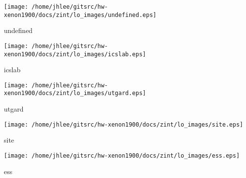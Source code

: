 \noindent
\vspace{1.4cm}
\begin{minipage}{.2\textwidth}
\begin{center}
\texttt{[image: /home/jhlee/gitsrc/hw-xenon1900/docs/zint/lo\_images/undefined.eps]}
\end{center}
\end{minipage}
\begin{minipage}{.7\textwidth}
undefined
\end{minipage}


\noindent
\vspace{1.4cm}
\begin{minipage}{.2\textwidth}
\begin{center}
\texttt{[image: /home/jhlee/gitsrc/hw-xenon1900/docs/zint/lo\_images/icslab.eps]}
\end{center}
\end{minipage}
\begin{minipage}{.7\textwidth}
icslab
\end{minipage}


\noindent
\vspace{1.4cm}
\begin{minipage}{.2\textwidth}
\begin{center}
\texttt{[image: /home/jhlee/gitsrc/hw-xenon1900/docs/zint/lo\_images/utgard.eps]}
\end{center}
\end{minipage}
\begin{minipage}{.7\textwidth}
utgard
\end{minipage}


\noindent
\vspace{1.4cm}
\begin{minipage}{.2\textwidth}
\begin{center}
\texttt{[image: /home/jhlee/gitsrc/hw-xenon1900/docs/zint/lo\_images/site.eps]}
\end{center}
\end{minipage}
\begin{minipage}{.7\textwidth}
site
\end{minipage}


\noindent
\vspace{1.4cm}
\begin{minipage}{.2\textwidth}
\begin{center}
\texttt{[image: /home/jhlee/gitsrc/hw-xenon1900/docs/zint/lo\_images/ess.eps]}
\end{center}
\end{minipage}
\begin{minipage}{.7\textwidth}
ess
\end{minipage}


